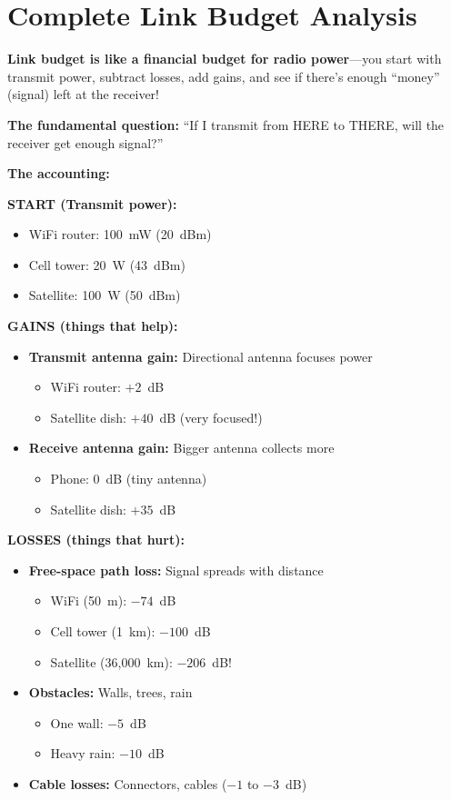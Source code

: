 \chapter{Complete Link Budget Analysis}
\label{ch:link-budget}

\begin{nontechnical}
\textbf{Link budget is like a financial budget for radio power}---you start with transmit power, subtract losses, add gains, and see if there's enough ``money'' (signal) left at the receiver!

\textbf{The fundamental question:} ``If I transmit from HERE to THERE, will the receiver get enough signal?''

\textbf{The accounting:}

\textbf{START (Transmit power):}
\begin{itemize}
\item WiFi router: 100~mW (20~dBm)
\item Cell tower: 20~W (43~dBm)
\item Satellite: 100~W (50~dBm)
\end{itemize}

\textbf{GAINS (things that help):}
\begin{itemize}
\item \textbf{Transmit antenna gain:} Directional antenna focuses power
  \begin{itemize}
  \item WiFi router: $+2$~dB
  \item Satellite dish: $+40$~dB (very focused!)
  \end{itemize}
\item \textbf{Receive antenna gain:} Bigger antenna collects more
  \begin{itemize}
  \item Phone: $0$~dB (tiny antenna)
  \item Satellite dish: $+35$~dB
  \end{itemize}
\end{itemize}

\textbf{LOSSES (things that hurt):}
\begin{itemize}
\item \textbf{Free-space path loss:} Signal spreads with distance
  \begin{itemize}
  \item WiFi (50~m): $-74$~dB
  \item Cell tower (1~km): $-100$~dB
  \item Satellite (36,000~km): $-206$~dB!
  \end{itemize}
\item \textbf{Obstacles:} Walls, trees, rain
  \begin{itemize}
  \item One wall: $-5$~dB
  \item Heavy rain: $-10$~dB
  \end{itemize}
\item \textbf{Cable losses:} Connectors, cables ($-1$ to $-3$~dB)
\end{itemize}


\end{nontechnical}
